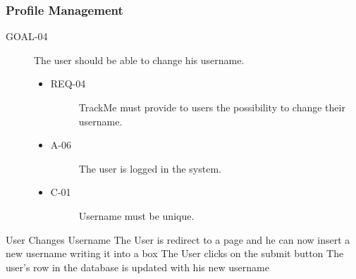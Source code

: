 \documentclass[a4paper]{article}
\newcommand{\requirement}{\ding{229}}%
\begin{document}
        
        \subsubsection{Profile Management }
        
        \begin{description}
        	\item[GOAL-04] The user should be able to change his username.
            	\begin{itemize}
            	    \item[\requirement]
                	\begin{description}
                	\item[REQ-04] TrackMe must provide to users the possibility to change their username. 
                	\end{description}
                	\item
                	\begin{description}
                	\item[A-06] The user is logged in the system.
                	\end{description}
                	\item
                	\begin{description}
                	\item[C-01] Username must be unique.
                	\end{description}
                	\end{itemize}
        \end{description}
        
        
        
       \begin{usecase}{User Changes Username}
              {The User is redirect to a page and he can now insert a new username writing it into a box}
              {The User clicks on the submit button}
              {The user's row in the database is updated with his new username}
       \end{usecase}
       
\end{document}
